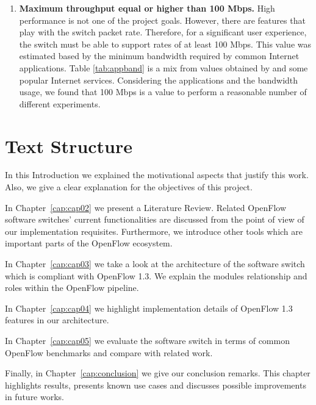 \begin{enumerate}
\begin{savenotes}
\begin{table}[h!]
\begin{tabular}{|l|l|l|}
    \end{tabular}
    \end{table}
\end{savenotes}

\item \textbf{Maximum throughput equal or higher than 100 Mbps.} High performance is not one of the project goals. However, there are features that play with the switch packet rate. Therefore, for a significant user experience, the switch must be able to support rates of at least 100 Mbps. This value was estimated based by the minimum bandwidth required by common Internet applications. Table \ref{tab:appband} is a mix from values obtained by \cite{Chen:2004:QRN:1234242.1234243} and some popular Internet services. Considering the applications and the bandwidth usage, we found that 100 Mbps is a value to perform a reasonable number of different experiments.          

\end{enumerate}




\section{Text Structure}
\label{sec:sec03}

In this Introduction we explained the motivational aspects that justify this work. Also, we give a clear explanation for the objectives of this project. 

In Chapter~\ref{cap:cap02} we present a Literature Review. Related OpenFlow software switches' current functionalities are discussed from the point of view of our implementation requisites. Furthermore, we introduce other tools which are important parts of the OpenFlow ecosystem. 

In Chapter~\ref{cap:cap03} we take a look at the architecture of the software switch which is compliant with OpenFlow 1.3. We explain the modules relationship and roles within the OpenFlow pipeline.

In Chapter~\ref{cap:cap04} we highlight implementation details of OpenFlow 1.3 features in our architecture.  

In Chapter~\ref{cap:cap05} we evaluate the software switch in terms of common OpenFlow benchmarks and compare with related work.

Finally, in Chapter~\ref{cap:conclusion} we give our conclusion remarks. This chapter highlights results, presents known use cases and discusses possible improvements in future works. 

